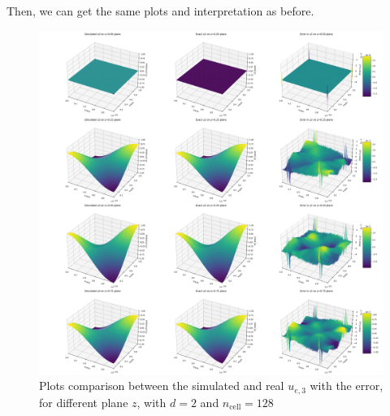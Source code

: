 \documentclass[a4paper,12pt,twoside]{report}
\begin{document}
Then, we can get the same plots and interpretation as before. 

\begin{figure}[!h]
	\centering
	\includegraphics[width=0.7\linewidth]{3d_plots_degree_2_non_mixed_ncell=128_function_u3_planes_z.png}
	\caption{Plots comparison between the simulated and real $u_{e,3}$ with the error, for different plane $z$, with $d=2$ and $n_{\text{cell}} = 128$}
	\label{fig:3D_plots_mixed_BC}
\end{figure}
\end{document}
